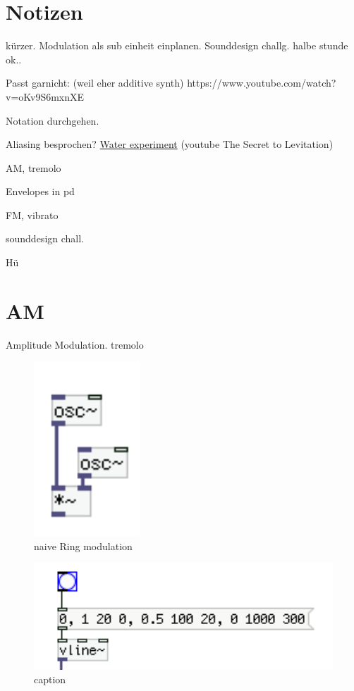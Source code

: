 \section{Notizen}

kürzer. Modulation als sub einheit einplanen.
Sounddesign challg. halbe stunde ok..

Passt garnicht: (weil eher additive synth)
https://www.youtube.com/watch?v=oKv9S6mxnXE


Notation durchgehen.

Aliasing besprochen?
\href{https://www.youtube.com/watch?v=GBtHeR-hY9Y}{Water experiment}
(youtube \glqq{}The Secret to Levitation\grqq{})

AM, tremolo

Envelopes in pd

FM, vibrato

sounddesign chall.

Hü




\section{AM} %
\label{sub:AM}

Amplitude Modulation. \glqq{}tremolo\grqq{}


\begin{figure}[H]
	\begin{center}
		\includegraphics[width = 4cm]{img/ringNaive.png}
		\caption{naive Ring modulation}
		\label{fig:name}
	\end{center}
\end{figure}


\begin{figure}[H]
	\begin{center}
		\includegraphics[width = 14cm]{img/simpleEnv.png}
		\caption{caption}
		\label{fig:name}
	\end{center}
\end{figure}

